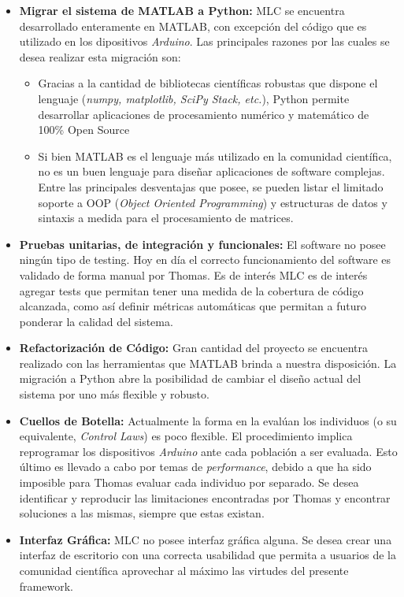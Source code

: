 \documentclass[a4paper,10pt]{article}
\begin{document}
        \begin{itemize}
            \item \textbf{Migrar el sistema de MATLAB a Python:} MLC se encuentra desarrollado enteramente en MATLAB, con excepción del
            código que es utilizado en los dipositivos \textit{Arduino}. Las principales razones por las cuales se desea realizar esta
            migración son:
            \begin{itemize}
                \item Gracias a la cantidad de bibliotecas científicas robustas que dispone el lenguaje (\textit{numpy, matplotlib,
                SciPy Stack, etc.}), Python permite desarrollar aplicaciones de procesamiento numérico y matemático de 100\% Open
                Source
                \item Si bien MATLAB es el lenguaje más utilizado en la comunidad científica, no es un buen
                lenguaje para diseñar aplicaciones de software complejas. Entre las principales desventajas que posee, se pueden listar
                el limitado soporte a OOP (\textit{Object Oriented Programming}) y estructuras de datos y sintaxis a medida para el
                procesamiento de matrices.
            \end{itemize}

            \item \textbf{Pruebas unitarias, de integración y funcionales:} El software no posee ningún tipo de testing. Hoy en día el
            correcto funcionamiento del software es validado de forma manual por Thomas. Es de interés
            MLC es de interés agregar tests que permitan tener una medida de la cobertura de código alcanzada, como así definir métricas
            automáticas que permitan a futuro ponderar la calidad del sistema.
            \item \textbf{Refactorización de Código:} Gran cantidad del proyecto se encuentra realizado con las herramientas que MATLAB
            brinda a nuestra disposición. La migración a Python abre la posibilidad de cambiar el diseño actual del sistema por uno más
            flexible y robusto.
            \item \textbf{Cuellos de Botella:} Actualmente la forma en la evalúan los individuos (o su equivalente, \textit{Control Laws})
            es poco flexible. El procedimiento implica reprogramar los dispositivos \textit{Arduino} ante cada población a ser evaluada.
            Esto último es llevado a cabo por temas de \textit{performance}, debido a que ha sido imposible para Thomas evaluar cada
            individuo por separado. Se desea identificar y reproducir las limitaciones encontradas por Thomas y encontrar soluciones a
            las mismas, siempre que estas existan.
            \item \textbf{Interfaz Gráfica:} MLC no posee interfaz gráfica alguna. Se desea crear una interfaz de escritorio
            con una correcta usabilidad que permita a usuarios de la comunidad científica aprovechar al máximo las virtudes del presente
            framework.
        \end{itemize}
\end{document}
